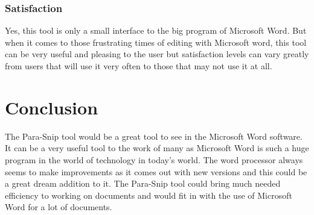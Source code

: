 \documentclass{article}
\begin{document}
\subsubsection{Satisfaction} 
	Yes, this tool is only a small interface to the big program of Microsoft Word. But when it comes to those frustrating times of editing with Microsoft word, this tool can be very useful and pleasing to the user but satisfaction levels can vary greatly from users that will use it very often to those that may not use it at all.

\section{Conclusion}
	The Para-Snip tool would be a great tool to see in the Microsoft Word software. It can be a very useful tool to the work of many as Microsoft Word is such a huge program in the world of technology in today's world. The word processor always seems to make improvements as it comes out with new versions and this could be a great dream addition to it. The Para-Snip tool could bring much needed efficiency to working on documents and would fit in with the use of Microsoft Word for a lot of documents.
\end{document}
